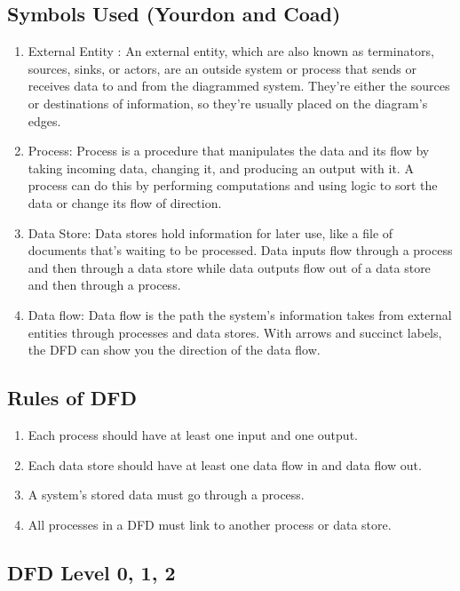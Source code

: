 \documentclass[11pt]{article}
\begin{document}
\subsection{Symbols Used (Yourdon and Coad)}
\begin{enumerate}

	\item External Entity : An external entity, which are also known as terminators, sources, sinks, or actors, are an outside system or process that sends or receives data to and from the diagrammed system. They’re either the sources or destinations of information, so they’re usually placed on the diagram’s edges.
	\item Process: Process is a procedure that manipulates the data and its flow by taking incoming data, changing it, and producing an output with it. A process can do this by performing computations and using logic to sort the data or change its flow of direction.
	\item Data Store: Data stores hold information for later use, like a file of documents that’s waiting to be processed. Data inputs flow through a process and then through a data store while data outputs flow out of a data store and then through a process.
	\item Data flow: Data flow is the path the system’s information takes from external entities through processes and data stores. With arrows and succinct labels, the DFD can show you the direction of the data flow.
\end{enumerate}

\subsection{Rules of DFD}
\begin{enumerate}
	\item Each process should have at least one input and one output.
	\item Each data store should have at least one data flow in and data flow out.
	\item A system’s stored data must go through a process.
	\item All processes in a DFD must link to another process or data store.
\end{enumerate}

\subsection{DFD Level 0, 1, 2}
\end{document}
